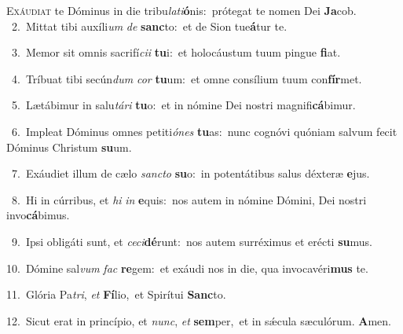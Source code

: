 \lettrine{\initial\textcolor{\initialcolor}{E}}{xáudiat} te Dóminus in die tribu\-\textit{la}\-\textit{ti}\textbf{ó}nis:~\star prótegat te nomen Dei \textbf{Ja}\-cob.\\
{\numbfont\textcolor{\numbcolor}{~2.}}~Mittat tibi auxíli\textit{um} \textit{de} \textbf{sanc}\-to:~\star et de Sion tue\-\textbf{á}\-tur te.\par
{\numbfont\textcolor{\numbcolor}{~3.}}~Memor sit omnis sacrifí\-\textit{ci}\-\textit{i} \textbf{tu}\-i:~\star et holocáustum tuum pingue \textbf{fi}\-at.\par
{\numbfont\textcolor{\numbcolor}{~4.}}~Tríbuat tibi secún\textit{dum} \textit{cor} \textbf{tu}\-um:~\star et omne consílium tuum con\-\textbf{fír}\-met.\par
{\numbfont\textcolor{\numbcolor}{~5.}}~Lætábimur in salu\-\textit{tá}\-\textit{ri} \textbf{tu}\-o:~\star et in nómine Dei nostri magnifi\-\textbf{cá}\-bimur.\par
{\numbfont\textcolor{\numbcolor}{~6.}}~Impleat Dóminus omnes petiti\-\textit{ó}\-\textit{nes} \textbf{tu}\-as:~\star nunc cognóvi quóniam salvum fecit Dóminus Christum \textbf{su}\-um.\par
{\numbfont\textcolor{\numbcolor}{~7.}}~Exáudiet illum de cælo \textit{sanc}\-\textit{to} \textbf{su}\-o:~\star in potentátibus salus déxteræ \textbf{e}\-jus.\par
{\numbfont\textcolor{\numbcolor}{~8.}}~Hi in cúrribus, et \textit{hi} \textit{in} \textbf{e}\-quis:~\star nos autem in nómine Dómini, Dei nostri invo\-\textbf{cá}\-bimus.\par
{\numbfont\textcolor{\numbcolor}{~9.}}~Ipsi obligáti sunt, et \textit{ce}\-\textit{ci}\textbf{dé}runt:~\star nos autem surréximus et erécti \textbf{su}\-mus.\par
{\numbfont\textcolor{\numbcolor}{10.}}~Dómine sal\textit{vum} \textit{fac} \textbf{re}\-gem:~\star et exáudi nos in die, qua invocavéri\textbf{mus} te.\par
{\numbfont\textcolor{\numbcolor}{11.}}~Glória Pa\-\textit{tri}\-, \textit{et} \textbf{Fí}\-lio,~\star et Spirítui \textbf{Sanc}\-to.\par
{\numbfont\textcolor{\numbcolor}{12.}}~Sicut erat in princípio, et \textit{nunc}\-, \textit{et} \textbf{sem}\-per,~\star et in sǽcula sæculórum. \textbf{A}\-men.\par
